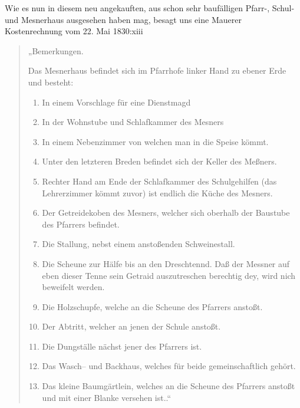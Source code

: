 \documentclass[12pt,a4paper]{book}
\begin{document}
Wie es nun in diesem neu angekauften, aus schon sehr baufälligen Pfarr-, Schul-
und Mesnerhaus ausgesehen haben mag, besagt uns eine Mauerer Kostenrechnung vom
22. Mai 1830:xiii

\begin{quote}

„Bemerkungen.

Das Mesnerhaus befindet sich im Pfarrhofe linker Hand zu ebener Erde und
besteht:

\begin{enumerate}
\item In einem Vorschlage für eine Dienstmagd

\item In der Wohnstube und Schlafkammer des Mesners

\item In einem Nebenzimmer von welchen man in die Speise kömmt.

\item Unter den letzteren Breden befindet sich der Keller des Meßners.

\item Rechter Hand am Ende der Schlafkammer des Schulgehilfen (das Lehrerzimmer
kömmt zuvor) ist endlich die Küche des Mesners.

\item Der Getreidekoben des Mesners, welcher sich oberhalb der Baustube des
Pfarrers befindet.

\item Die Stallung, nebst einem anstoßenden Schweinestall.

\item Die Scheune  zur Hälfe bis an den Dreschtennd. Daß der Messner auf eben
dieser Tenne sein Getraid auszutreschen berechtig dey, wird nich beweifelt
werden.

\item Die Holzschupfe, welche an die Scheune des Pfarrers anstoßt.

\item Der Abtritt, welcher an jenen der Schule anstoßt.

\item Die Dungställe nächst jener des Pfarrers ist.

\item Das Wasch– und Backhaus, welches für beide gemeinschaftlich gehört.

\item Das kleine Baumgärtlein, welches an die Scheune des Pfarrers anstoßt und
mit einer Blanke versehen ist..“
\end{enumerate}
\end{quote}
\end{document}
